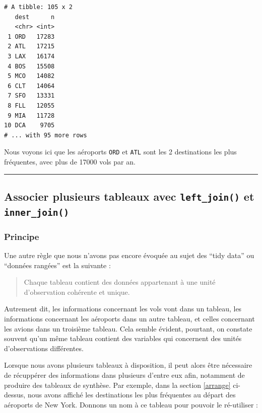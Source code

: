 \documentclass[a4paperpaper,]{article}
\begin{document}
\begin{verbatim}
# A tibble: 105 x 2
   dest      n
   <chr> <int>
 1 ORD   17283
 2 ATL   17215
 3 LAX   16174
 4 BOS   15508
 5 MCO   14082
 6 CLT   14064
 7 SFO   13331
 8 FLL   12055
 9 MIA   11728
10 DCA    9705
# ... with 95 more rows
\end{verbatim}

Nous voyons ici que les aéroports \texttt{ORD} et \texttt{ATL} sont les 2 destinations les plus fréquentes, avec plus de 17000 vols par an.

\begin{center}\rule{0.5\linewidth}{\linethickness}\end{center}

\hypertarget{associer-plusieurs-tableaux-avec-left_join-et-inner_join}{%
\subsection{\texorpdfstring{Associer plusieurs tableaux avec \texttt{left\_join()} et \texttt{inner\_join()}}{Associer plusieurs tableaux avec left\_join() et inner\_join()}}\label{associer-plusieurs-tableaux-avec-left_join-et-inner_join}}

\hypertarget{principe-2}{%
\subsubsection{Principe}\label{principe-2}}

Une autre règle que nous n'avons pas encore évoquée au sujet des ``tidy data'' ou ``données rangées'' est la suivante :

\begin{quote}
Chaque tableau contient des données appartenant à une unité d'observation cohérente et unique.
\end{quote}

Autrement dit, les informations concernant les vols vont dans un tableau, les informations concernant les aéroports dans un autre tableau, et celles concernant les avions dans un troisième tableau. Cela semble évident, pourtant, on constate souvent qu'un même tableau contient des variables qui concernent des unités d'observations différentes.

Lorsque nous avons plusieurs tableaux à disposition, il peut alors être nécessaire de récuppérer des informations dans plusieurs d'entre eux afin, notamment de produire des tableaux de synthèse. Par exemple, dans la section \ref{arrange} ci-dessus, nous avons affiché les destinations les plus fréquentes au départ des aéroports de New York. Donnons un nom à ce tableau pour pouvoir le ré-utiliser :
\end{document}
